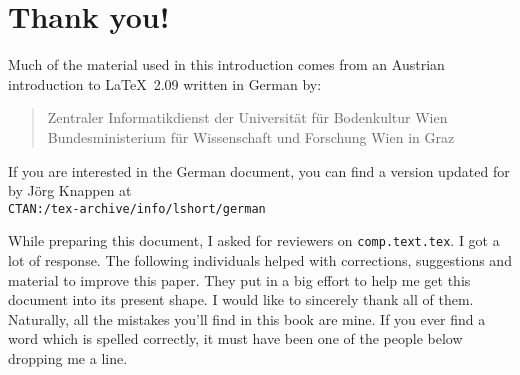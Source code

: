 \chapter{Thank you!}
\noindent Much of the material used in this introduction comes from an
Austrian introduction to \LaTeX\ 2.09 written in German by:
\begin{verse}
%
{Zentraler Informatikdienst der Universit\"at f\"ur Bodenkultur Wien}
%
   {Bundesministerium f\"ur Wissenschaft und Forschung Wien}
%
   {in Graz}
\end{verse}

If you are interested in the German document, you can find a version
updated for \LaTeXe{} by J\"org Knappen at\\
\texttt{CTAN:/tex-archive/info/lshort/german}

\noindent While preparing this document, I asked
for reviewers on \texttt{comp.text.tex}. I got a lot of response. The
following individuals helped with corrections, suggestions and
material to improve this paper. They put in a big effort to help me
get this document into its present shape. I would like to
sincerely thank all of them. Naturally, all the mistakes you'll find
in this book are mine. If you ever find a word which is spelled
correctly, it must have been one of the people below dropping me a
line.


